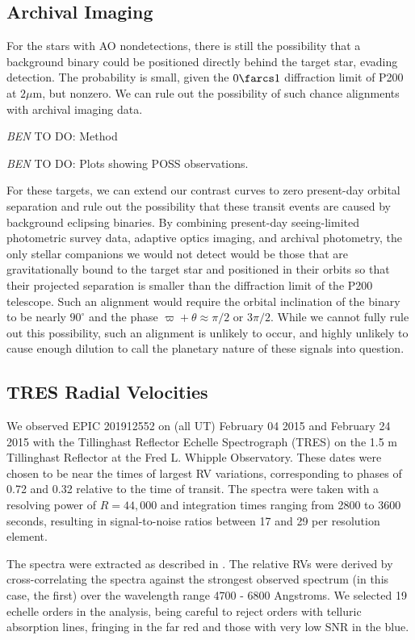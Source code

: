 \documentclass{emulateapj}
\newcommand{\todo}[3]{{\color{#2} \emph{#1} TO DO: #3}}
\newcommand{\btmtodo}[1]{\todo{BEN}{red}{#1}}
\begin{document}
\subsection{Archival Imaging}

For the stars with AO nondetections, there is still the
possibility that a background binary could be positioned
directly behind the target star, evading detection.
The probability is small, given the $0\farcs1$ diffraction limit
of P200 at $2\mu$m, but nonzero.
We can rule out the possibility of such chance alignments with 
archival imaging data. 

\btmtodo{Method}

\btmtodo{Plots showing POSS observations.}

For these targets, we can extend our contrast curves to zero 
present-day orbital separation and rule out the possibility that
these transit events are caused by background eclipsing binaries.
By combining present-day seeing-limited photometric survey data, 
adaptive optics imaging, and archival photometry, the only stellar companions 
we would not detect would be those that are gravitationally bound to the target 
star and positioned in their orbits so that their projected separation is
smaller than the diffraction limit of the P200 telescope.
Such an alignment would require the orbital inclination of the binary to be 
nearly $90^\circ$ and the phase $\varpi + \theta \approx \pi/2$ or $3\pi/2$.
While we cannot fully rule out this possibility, such an alignment is unlikely
to occur, and highly unlikely to cause enough dilution to call the planetary
nature of these signals into question.




\subsection{TRES Radial Velocities}

We observed EPIC 201912552 on (all UT) February 04 2015 and February 24 2015 
with the Tillinghast Reflector Echelle
Spectrograph (TRES) on the 1.5 m Tillinghast Reflector at the Fred L.
Whipple Observatory. 
These dates were chosen to be near the times of largest RV variations, 
corresponding to phases of 0.72 and 0.32 relative to the time
of transit.
The spectra were taken with a resolving power of $R=44,000$ and 
integration times ranging from 2800 to 3600 seconds, resulting in 
signal-to-noise ratios between 17 and 29 per resolution element.

The spectra were extracted as described in \citet{Buchhave10}. 
The relative RVs were derived by cross-correlating the spectra against the
strongest observed spectrum (in this case, the first) over the wavelength
range 4700 - 6800 Angstroms. 
We selected 19 echelle orders in the analysis, being careful to reject
orders with telluric absorption lines, fringing in the far red and those
with very low SNR in the blue.
\end{document}
